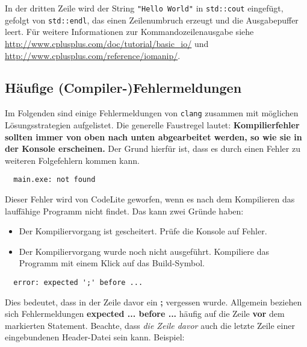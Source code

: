 In der dritten Zeile wird der String \lstinline{"Hello World"} in \lstinline{std::cout} eingefügt, gefolgt von \lstinline{std::endl}, das einen Zeilenumbruch erzeugt und die Ausgabepuffer leert. Für weitere Informationen zur Kommandozeilenausgabe siehe \url{http://www.cplusplus.com/doc/tutorial/basic_io/} und \url{http://www.cplusplus.com/reference/iomanip/}.


\subsection*{Häufige (Compiler-)Fehlermeldungen}

Im Folgenden sind einige Fehlermeldungen von \texttt{clang} zusammen mit möglichen Lösungsstrategien aufgelistet.
Die generelle Faustregel lautet: 
\textbf{Kompilierfehler sollten immer von oben nach unten abgearbeitet werden, so wie sie in der Konsole erscheinen.}
Der Grund hierfür ist, dass es durch einen Fehler zu weiteren Folgefehlern kommen kann.


\begin{verbatim}
  main.exe: not found
\end{verbatim}

Dieser Fehler wird von CodeLite geworfen, wenn es nach dem Kompilieren das lauffähige Programm nicht findet.
Das kann zwei Gründe haben:
\begin{itemize}
\item Der Kompiliervorgang ist gescheitert. Prüfe die Konsole auf Fehler.
\item Der Kompiliervorgang wurde noch nicht ausgeführt. Kompiliere das Programm mit einem Klick auf das Build-Symbol.
\end{itemize}

\begin{verbatim}
  error: expected ';' before ...
\end{verbatim}

Dies bedeutet, dass in der Zeile davor ein \textbf{;} vergessen wurde.
Allgemein beziehen sich Fehlermeldungen \textbf{expected ... before ...} häufig auf die Zeile \textbf{vor} dem markierten Statement.
Beachte, dass \emph{die Zeile davor} auch die letzte Zeile einer eingebundenen Header-Datei sein kann. Beispiel:


